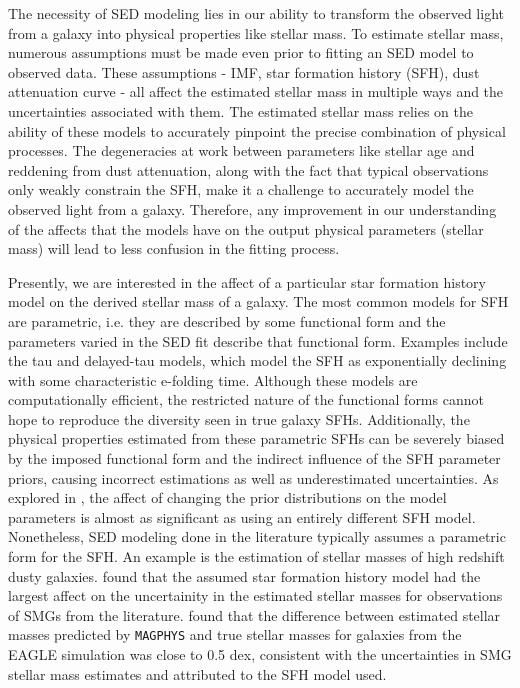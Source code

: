 \documentclass[twocolumn]{aastex62}
\begin{document}
The necessity of SED modeling lies in our ability to transform the observed light from a galaxy into physical properties like stellar mass. To estimate stellar mass, numerous assumptions must be made even prior to fitting an SED model to observed data. These assumptions - IMF, star formation history (SFH), dust attenuation curve - all affect the estimated stellar mass in multiple ways and the uncertainties associated with them. The estimated stellar mass relies on the ability of these models to accurately pinpoint the precise combination of physical processes. The degeneracies at work between parameters like stellar age and reddening from dust attenuation, along with the fact that typical observations only weakly constrain the SFH, make it a challenge to accurately model the observed light from a galaxy. Therefore, any improvement in our understanding of the affects that the models have on the output physical parameters (stellar mass) will lead to less confusion in the fitting process. 

Presently, we are interested in the affect of a particular star formation history model on the derived stellar mass of a galaxy. The most common models for SFH are parametric, i.e. they are described by some functional form and the parameters varied in the SED fit describe that functional form. Examples include the tau and delayed-tau models, which model the SFH as exponentially declining with some characteristic e-folding time. Although these models are computationally efficient, the restricted nature of the functional forms cannot hope to reproduce the diversity seen in true galaxy SFHs. Additionally, the physical properties estimated from these parametric SFHs can be severely biased by the imposed functional form and the indirect influence of the SFH parameter priors, causing incorrect estimations as well as underestimated uncertainties. As explored in \cite{carnall_how_2018}, the affect of changing the prior distributions on the model parameters is almost as significant as using an entirely different SFH model. Nonetheless, SED modeling done in the literature typically assumes a parametric form for the SFH. An example is the estimation of stellar masses of high redshift dusty galaxies. \cite{michalowski_stellar_2012} found that the assumed star formation history model had the largest affect on the uncertainity in the estimated stellar masses for observations of SMGs from the literature. \cite{dudzeviciute_alma_2019} found that the difference between estimated stellar masses predicted by \texttt{MAGPHYS} and true stellar masses for galaxies from the EAGLE simulation was close to 0.5 dex, consistent with the uncertainties in SMG stellar mass estimates and attributed to the SFH model used. 
\end{document}
